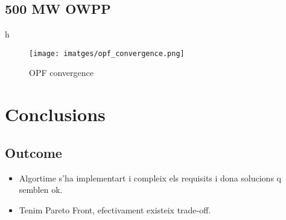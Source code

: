 \documentclass[a4paper,11pt, titlepage, twoside]{article}
\begin{document}
\subsection{500 MW OWPP}
h
\begin{figure}[h]
    \centering
    \texttt{[image: imatges/opf\_convergence.png]}
    \caption{OPF convergence}
    \label{fig:opfconv}   
\end{figure}

\section{Conclusions}\label{Conclusions}


\subsection{Outcome}

\begin{itemize}
    \item Algortime s'ha implementart i compleix els requisits i dona solucions q semblen ok.
    \item Tenim Pareto Front, efectivament existeix trade-off.
\end{itemize}
\end{document}
